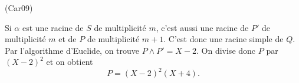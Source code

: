 \begin{tiny}(Car09)\end{tiny} Si $\alpha$ est une racine de $S$ de multiplicité $m$, c'est aussi une racine de $P'$ de multiplicité $m$ et de $P$ de multiplicité $m+1$. C'est donc une racine simple de $Q$.\newline
Par l'algorithme d'Euclide, on trouve $P\wedge P' = X-2$. On divise donc $P$ par $(X-2)^2$ et on obtient
\[
 P = (X-2)^2(X+4).
\]
